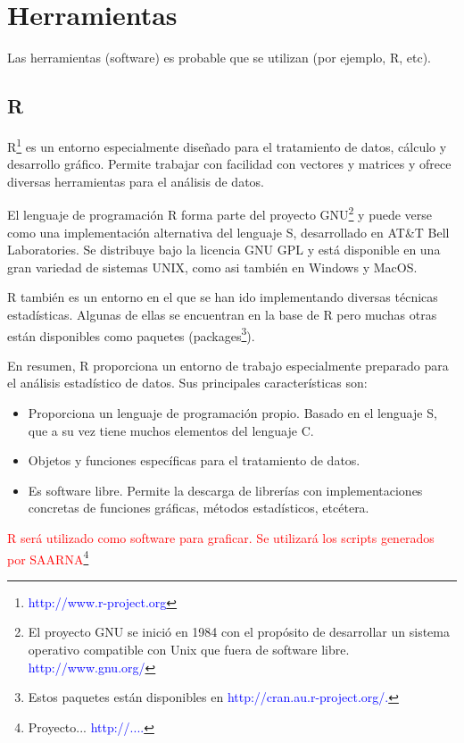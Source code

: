 \documentclass[12pt,a4paper,spanish]{article}
\begin{document}

\section{Herramientas} 
	Las herramientas (software) es probable que se utilizan (por ejemplo, R, etc).
	\subsection{R}
		\par \textsc{R}\footnote{\textcolor{blue}{http://www.r-project.org}} es un entorno especialmente diseñado para el tratamiento de datos, cálculo y 			desarrollo gráfico. Permite trabajar con facilidad con vectores y matrices y ofrece diversas herramientas para el análisis de datos.
		\par El lenguaje de programación \textsc{R} forma parte del proyecto GNU\footnote{El proyecto GNU se inició en 1984 con el propósito de 	
		desarrollar un sistema operativo compatible con Unix que fuera de software libre. \textcolor{blue}{http://www.gnu.org/}} y puede verse como una 		implementación alternativa del lenguaje \textsc{S}, desarrollado en AT&T Bell Laboratories. Se distribuye bajo la licencia GNU GPL y está 			disponible en una gran variedad de sistemas UNIX, como asi también en Windows y MacOS.
		\par \textsc{R} también es un entorno en el que se han ido implementando diversas técnicas estadísticas. Algunas de ellas se encuentran en la base 			de R pero muchas otras están disponibles como paquetes (packages\footnote{Estos paquetes están disponibles en 
		\textcolor{blue}{http://cran.au.r-project.org/.}}).
		\par En resumen, R proporciona un entorno de trabajo especialmente preparado para el análisis estadístico de datos. Sus principales 		
		características son:
		\begin{itemize}
			\item Proporciona un lenguaje de programación propio. Basado en el lenguaje S, que a su vez tiene muchos elementos del lenguaje C. 
			\item Objetos y funciones específicas para el tratamiento de datos.
			\item Es software libre. Permite la descarga de librerías con implementaciones concretas de funciones gráficas, métodos estadísticos, etcétera.
		\end{itemize}
		\textcolor{red}{\textsc{R} será utilizado como software para graficar. Se utilizará los scripts generados por SAARNA\footnote{Proyecto... 			\textcolor{blue}{http://....}}}
\end{document}
